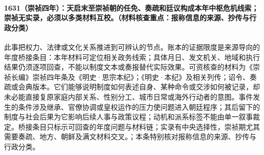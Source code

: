 \paragraph{1631（崇祯四年）：天启末至崇祯朝的任免、奏疏和廷议构成本年中枢危机线索；崇祯无实录，必须以多类材料互校。（材料核查重点：报称信息的来源、抄传与行政分类）} 此事把权力、法律或文化关系推进到可辨认的节点。账本的证据限度是来源导向的年度桥接条目：本年材料可定位相关政务线索；具体月日、发文机关、地域和执行结果仍须逐项回查，不能以制度文本或奏报替代实际效果。可资核查的材料为《崇祯长编》崇祯四年条及《明史·思宗本纪》；《明史·本纪》及相关列传；诏令、奏疏或会典版本。它们能够说明制度如何表述自身、某种命令或交涉如何被记录，却未必能直接复原家庭内部关系、性别分工、城市日常或海外行动者的意图。事件发生的条件涉及继承、官僚协调或皇权运作的压力使问题进入朝廷程序；其后留下的制度与社会后果为它影响后续人事与政策议程；动机和派系标签不能由单一叙事裁定。桥接条目只标示可回查的年度问题与材料链；实录有中央选择性，崇祯期尤其需要奏疏、地方、朝鲜及满文材料交叉。；本条特别核对报称信息的来源、抄传与行政分类。

